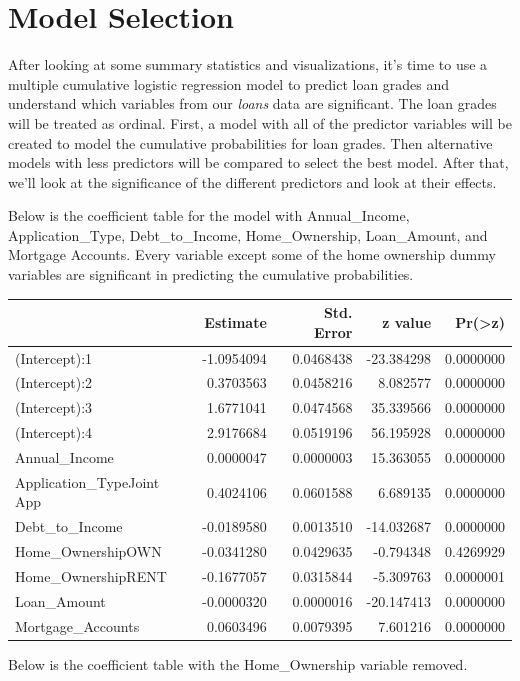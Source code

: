 \documentclass[11pt,]{article}
\begin{document}
\hypertarget{model-selection}{%
\section{Model Selection}\label{model-selection}}

After looking at some summary statistics and visualizations, it's time
to use a multiple cumulative logistic regression model to predict loan
grades and understand which variables from our \emph{loans} data are
significant. The loan grades will be treated as ordinal. First, a model
with all of the predictor variables will be created to model the
cumulative probabilities for loan grades. Then alternative models with
less predictors will be compared to select the best model. After that,
we'll look at the significance of the different predictors and look at
their effects.

Below is the coefficient table for the model with Annual\_Income,
Application\_Type, Debt\_to\_Income, Home\_Ownership, Loan\_Amount, and
Mortgage Accounts. Every variable except some of the home ownership
dummy variables are significant in predicting the cumulative
probabilities.

\begin{longtable}[]{@{}lrrrr@{}}
\toprule
& Estimate & Std. Error & z value &
Pr(\textgreater{}\textbar{}z\textbar{})\tabularnewline
\midrule
\endhead
(Intercept):1 & -1.0954094 & 0.0468438 & -23.384298 &
0.0000000\tabularnewline
(Intercept):2 & 0.3703563 & 0.0458216 & 8.082577 &
0.0000000\tabularnewline
(Intercept):3 & 1.6771041 & 0.0474568 & 35.339566 &
0.0000000\tabularnewline
(Intercept):4 & 2.9176684 & 0.0519196 & 56.195928 &
0.0000000\tabularnewline
Annual\_Income & 0.0000047 & 0.0000003 & 15.363055 &
0.0000000\tabularnewline
Application\_TypeJoint App & 0.4024106 & 0.0601588 & 6.689135 &
0.0000000\tabularnewline
Debt\_to\_Income & -0.0189580 & 0.0013510 & -14.032687 &
0.0000000\tabularnewline
Home\_OwnershipOWN & -0.0341280 & 0.0429635 & -0.794348 &
0.4269929\tabularnewline
Home\_OwnershipRENT & -0.1677057 & 0.0315844 & -5.309763 &
0.0000001\tabularnewline
Loan\_Amount & -0.0000320 & 0.0000016 & -20.147413 &
0.0000000\tabularnewline
Mortgage\_Accounts & 0.0603496 & 0.0079395 & 7.601216 &
0.0000000\tabularnewline
\bottomrule
\end{longtable}

Below is the coefficient table with the Home\_Ownership variable
removed.
\end{document}
